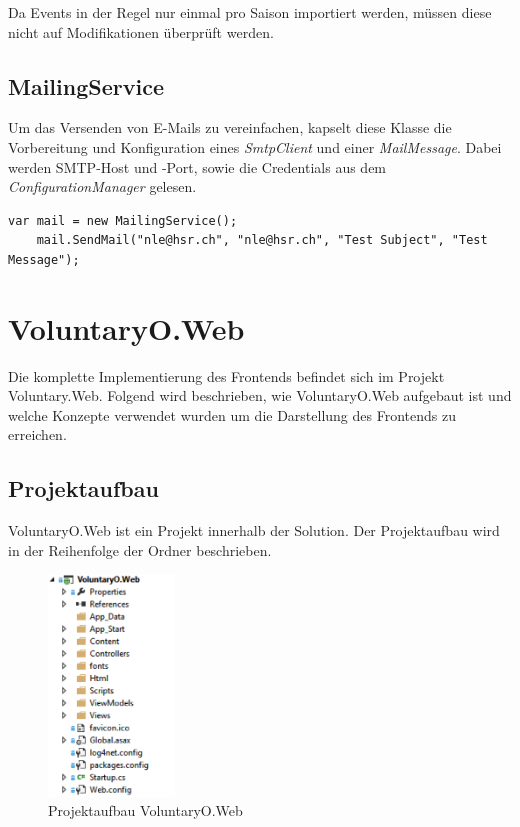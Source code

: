 			\noindent
			Da Events in der Regel nur einmal pro Saison importiert werden, müssen diese nicht auf Modifikationen überprüft werden.
	
	\subsection{MailingService}
		Um das Versenden von E-Mails zu vereinfachen, kapselt diese Klasse die Vorbereitung und Konfiguration eines \textit{SmtpClient} und einer \textit{MailMessage}. Dabei werden SMTP-Host und -Port, sowie die Credentials aus dem \textit{ConfigurationManager} gelesen.  

		\begin{lstlisting}[language=CSharp, caption=Verwendung des MailingService, label=lst:mailingservice, firstnumber=1]
	var mail = new MailingService();
	mail.SendMail("nle@hsr.ch", "nle@hsr.ch", "Test Subject", "Test Message");
	    \end{lstlisting}
    



\section{VoluntaryO.Web}
	Die komplette Implementierung des Frontends befindet sich im Projekt Voluntary.Web. Folgend wird beschrieben, wie VoluntaryO.Web aufgebaut ist und welche Konzepte verwendet wurden um die Darstellung des Frontends zu erreichen.

	\subsection{Projektaufbau}
		VoluntaryO.Web ist ein Projekt innerhalb der Solution. Der Projektaufbau wird in der Reihenfolge der Ordner beschrieben.

		\begin{figure}[H]
	    	\centering
	    	 \includegraphics[width=0.3\textwidth]{content/architekturdokumentation/images/web-1-Projektaufbau.png}
	  		\vspace{-10pt}
			\caption{Projektaufbau VoluntaryO.Web}
		\end{figure}

